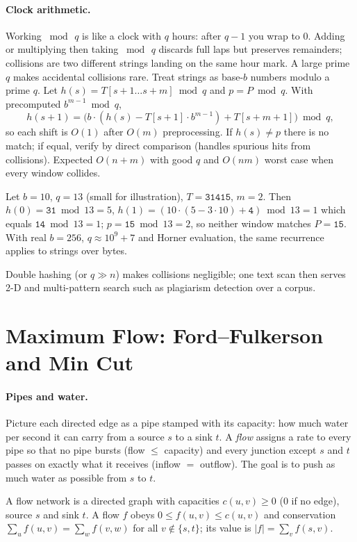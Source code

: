 \paragraph{Clock arithmetic.} Working $\bmod\,q$ is like a clock with $q$ hours: after $q-1$ you wrap to $0$. Adding or multiplying then taking $\bmod\,q$ discards full laps but preserves remainders; collisions are two different strings landing on the same hour mark. A large prime $q$ makes accidental collisions rare.
Treat strings as base-$b$ numbers modulo a prime $q$. Let $h(s)=T[s+1\ldots s+m]\bmod q$ and $p=P\bmod q$. With precomputed $b^{m-1}\bmod q$,
\[
h(s+1)=\bigl(b\cdot(h(s)-T[s+1]\cdot b^{m-1})+T[s+m+1]\bigr)\bmod q,
\]
so each shift is $O(1)$ after $O(m)$ preprocessing. If $h(s)\neq p$ there is no match; if equal, verify by direct comparison (handles spurious hits from collisions). Expected $O(n+m)$ with good $q$ and $O(nm)$ worst case when every window collides.

\begin{example}
Let $b=10$, $q=13$ (small for illustration), $T=\mathtt{31415}$, $m=2$. Then $h(0)=\mathtt{31}\bmod13=5$, $h(1)=(10\cdot(5-3\cdot10)+\mathtt{4})\bmod13=1$ which equals $\mathtt{14}\bmod13=1$; $p=\mathtt{15}\bmod13=2$, so neither window matches $P=\mathtt{15}$. With real $b=256$, $q\approx10^9+7$ and Horner evaluation, the same recurrence applies to strings over bytes.
\end{example}

Double hashing (or $q\gg n$) makes collisions negligible; one text scan then serves 2-D and multi-pattern search such as plagiarism detection over a corpus.

\section{Maximum Flow: Ford--Fulkerson and Min Cut}
\label{sec:maxflow}
\paragraph{Pipes and water.} Picture each directed edge as a pipe stamped with its capacity: how much water per second it can carry from a source $s$ to a sink $t$. A \emph{flow} assigns a rate to every pipe so that no pipe bursts (flow $\le$ capacity) and every junction except $s$ and $t$ passes on exactly what it receives (inflow $=$ outflow). The goal is to push as much water as possible from $s$ to $t$.
\begin{definition} A flow network is a directed graph with capacities $c(u,v)\ge 0$ ($0$ if no edge), source $s$ and sink $t$. A flow $f$ obeys $0\le f(u,v)\le c(u,v)$ and conservation $\sum_u f(u,v)=\sum_w f(v,w)$ for all $v\notin\{s,t\}$; its value is $|f|=\sum_v f(s,v)$.
\end{definition}
